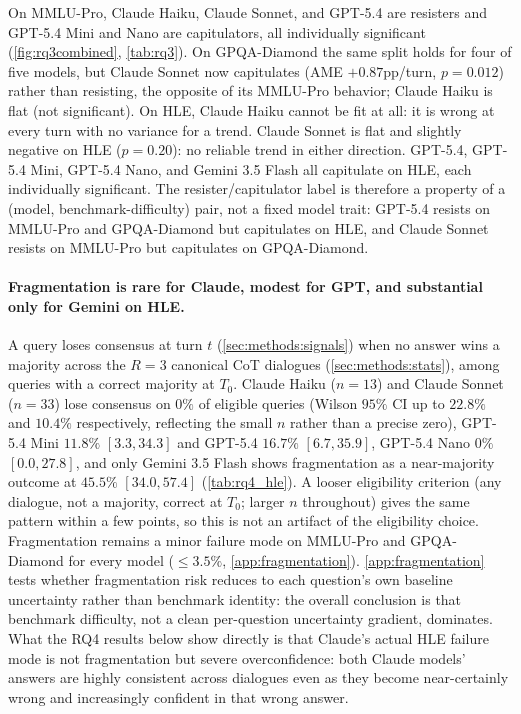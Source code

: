 On MMLU-Pro, Claude Haiku, Claude Sonnet, and GPT-5.4 are resisters and GPT-5.4 Mini and Nano are capitulators, all individually significant (\autoref{fig:rq3combined}, \autoref{tab:rq3}). On GPQA-Diamond the same split holds for four of five models, but Claude Sonnet now capitulates (AME $+0.87$pp/turn, $p=0.012$) rather than resisting, the opposite of its MMLU-Pro behavior; Claude Haiku is flat (not significant). On HLE, Claude Haiku cannot be fit at all: it is wrong at every turn with no variance for a trend. Claude Sonnet is flat and slightly negative on HLE ($p=0.20$): no reliable trend in either direction. GPT-5.4, GPT-5.4 Mini, GPT-5.4 Nano, and Gemini 3.5 Flash all capitulate on HLE, each individually significant. The resister/capitulator label is therefore a property of a (model, benchmark-difficulty) pair, not a fixed model trait: GPT-5.4 resists on MMLU-Pro and GPQA-Diamond but capitulates on HLE, and Claude Sonnet resists on MMLU-Pro but capitulates on GPQA-Diamond.

\paragraph{Fragmentation is rare for Claude, modest for GPT, and substantial only for Gemini on HLE.} A query loses consensus at turn $t$ (\autoref{sec:methods:signals}) when no answer wins a majority across the $R=3$ canonical CoT dialogues (\autoref{sec:methods:stats}), among queries with a correct majority at $T_0$. Claude Haiku ($n=13$) and Claude Sonnet ($n=33$) lose consensus on $0\%$ of eligible queries (Wilson $95\%$ CI up to $22.8\%$ and $10.4\%$ respectively, reflecting the small $n$ rather than a precise zero), GPT-5.4 Mini $11.8\%$ $[3.3,34.3]$ and GPT-5.4 $16.7\%$ $[6.7,35.9]$, GPT-5.4 Nano $0\%$ $[0.0,27.8]$, and only Gemini 3.5 Flash shows fragmentation as a near-majority outcome at $45.5\%$ $[34.0,57.4]$ (\autoref{tab:rq4_hle}). A looser eligibility criterion (any dialogue, not a majority, correct at $T_0$; larger $n$ throughout) gives the same pattern within a few points, so this is not an artifact of the eligibility choice. Fragmentation remains a minor failure mode on MMLU-Pro and GPQA-Diamond for every model ($\leq 3.5\%$, \autoref{app:fragmentation}). \autoref{app:fragmentation} tests whether fragmentation risk reduces to each question's own baseline uncertainty rather than benchmark identity: the overall conclusion is that benchmark difficulty, not a clean per-question uncertainty gradient, dominates. What the RQ4 results below show directly is that Claude's actual HLE failure mode is not fragmentation but severe overconfidence: both Claude models' answers are highly consistent across dialogues even as they become near-certainly wrong and increasingly confident in that wrong answer.

